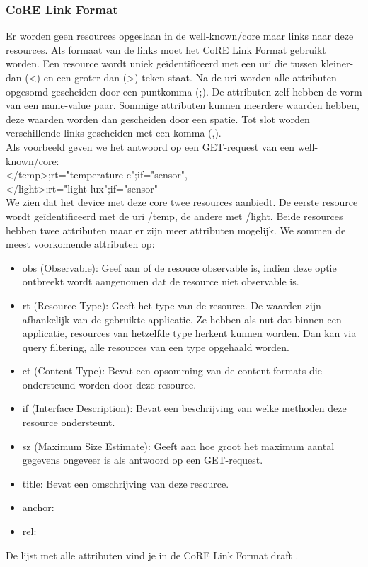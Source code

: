 \subsubsection{CoRE Link Format}
Er worden geen resources opgeslaan in de well-known/core maar links naar deze resources. Als formaat van de links moet het CoRE Link Format gebruikt worden. Een resource wordt uniek ge\"{i}dentificeerd met een uri die tussen kleiner-dan (\textless) en een groter-dan (\textgreater) teken staat. Na de uri worden alle attributen opgesomd gescheiden door een puntkomma (;). De attributen zelf hebben de vorm van een name-value paar. Sommige attributen kunnen meerdere waarden hebben, deze waarden worden dan gescheiden door een spatie. Tot slot worden verschillende links gescheiden met een komma (,).\\

\noindent
Als voorbeeld geven we het antwoord op een GET-request van een well-known/core:\\
\textless/temp\textgreater;rt="temperature-c";if="sensor",\\
\textless/light\textgreater;rt="light-lux";if="sensor"\\
We zien dat het device met deze core twee resources aanbiedt. De eerste resource wordt ge\"{i}dentificeerd met de uri /temp, de andere met /light. Beide resources hebben twee attributen maar er zijn meer attributen mogelijk. We sommen de meest voorkomende attributen op:
\begin{itemize}
\item obs (Observable): Geef aan of de resouce observable is, indien deze optie ontbreekt wordt aangenomen dat de resource niet observable is.
\item rt (Resource Type): Geeft het type van de resource. De waarden zijn afhankelijk van de gebruikte applicatie. Ze hebben als nut dat binnen een applicatie, resources van hetzelfde type herkent kunnen worden. Dan kan via query filtering, alle resources van een type opgehaald worden.
\item ct (Content Type): Bevat een opsomming van de content formats die ondersteund worden door deze resource. 
\item if (Interface Description): Bevat een beschrijving van welke methoden deze resource ondersteunt.
\item sz (Maximum Size Estimate): Geeft aan hoe groot het maximum aantal gegevens ongeveer is als antwoord op een GET-request.
\item title: Bevat een omschrijving van deze resource.
\item anchor: 
\item rel: 
\end{itemize}
De lijst met alle attributen vind je in de CoRE Link Format draft \cite{coapDiscovery}.

